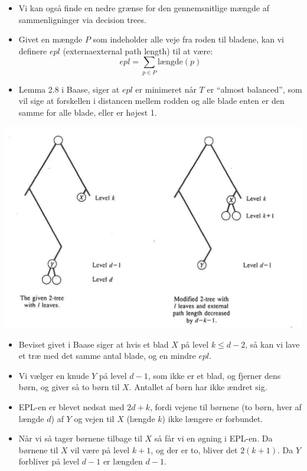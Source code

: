 \begin{frame}[allowframebreaks]
\begin{itemize}
	\item Vi kan også finde en nedre grænse for den gennemsnitlige mængde af sammenligninger via decision trees.
	\item Givet en mængde $P$ som indeholder alle veje fra roden til bladene, kan vi definere $epl$ (externaexternal path length) til at være:
		  \begin{equation*}
			epl = \sum_{p \in P} \text{længde}(p)
		  \end{equation*}
	\item Lemma 2.8 i Baase, siger at $epl$ er minimeret når $T$ er ``almost balanced'', som vil sige at forskellen i distancen mellem rodden og alle blade enten er den samme for alle blade, eller er højest 1.
  \end{itemize}
  \begin{center}
	\includegraphics[scale=0.3]{figur/baaselemma28.png}
  \end{center}
  \begin{itemize}
	\item Beviset givet i Baase siger at hvis et blad $X$ på level $k \le d-2$, så kan vi lave et træ med det samme antal blade, og en mindre $epl$.
	\item  Vi vælger en knude $Y$ på level $d-1$, som ikke er et blad, og fjerner dens børn, og giver så to børn til $X$. Antallet af børn har ikke ændret sig.
	\item EPL-en er blevet nedsat med $2d+k$, fordi vejene til børnene (to børn, hver af længde $d$) af $Y$ og vejen til $X$ (længde $k$) ikke længere er forbundet.
	\item Når vi så tager børnene tilbage til $X$  så får vi en øgning i EPL-en. Da børnene til $X$ vil være på level $k+1$, og der er to, bliver det $2(k+1)$. Da $Y$ forbliver på level $d-1$ er længden $d-1$.

\end{itemize}
\end{frame}
